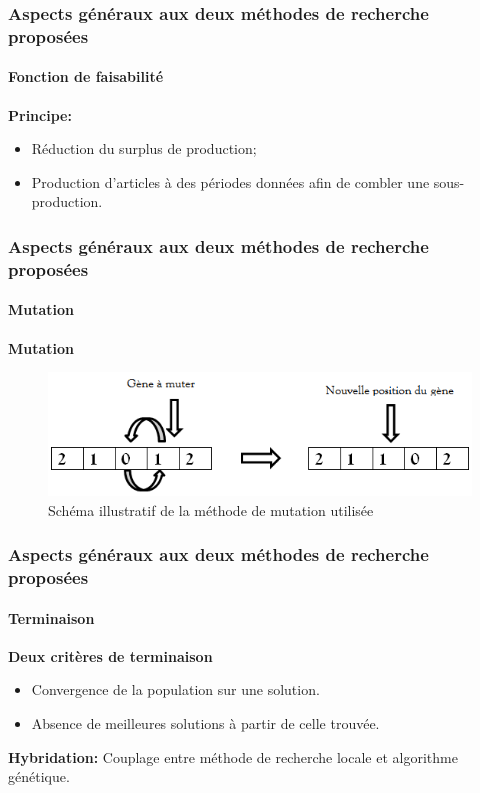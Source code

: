 \documentclass[11pt]{beamer}
\begin{document}
 \begin{frame}
 \frametitle{Aspects généraux aux deux méthodes de recherche proposées}
 \framesubtitle{Fonction de faisabilité}
	
	\textbf{Principe:}
	\vspace*{.5cm}
    \begin{itemize}
    	\item Réduction du surplus de production;
    	\vspace*{.5cm}
    	\item Production d'articles à des périodes données afin de combler une sous-production.
    \end{itemize}
	
 \end{frame} 
 
 \begin{frame}
 \frametitle{Aspects généraux aux deux méthodes de recherche proposées}
 \framesubtitle{Mutation}
	
	\textbf{Mutation}
	\begin{figure}[!h]
		\begin{center}
			\includegraphics[scale=.5
			]{img/mutation_fig.png}
			\caption{Schéma illustratif de la méthode de mutation utilisée}
		\end{center}
 \end{figure}
	
 \end{frame}
 
 \begin{frame}
 \frametitle{Aspects généraux aux deux méthodes de recherche proposées}
 \framesubtitle{Terminaison}
	
	\textbf{Deux critères de terminaison}
	\vspace*{.5cm}
	\begin{itemize}
		\item Convergence de la population sur une solution.
		\vspace*{.5cm}
		\item Absence de meilleures solutions à partir de celle trouvée.
	\end{itemize}
	\vspace*{.5cm}
	\textbf{Hybridation:} Couplage entre méthode de recherche locale et algorithme génétique.
	
 \end{frame}
 
\end{document}
